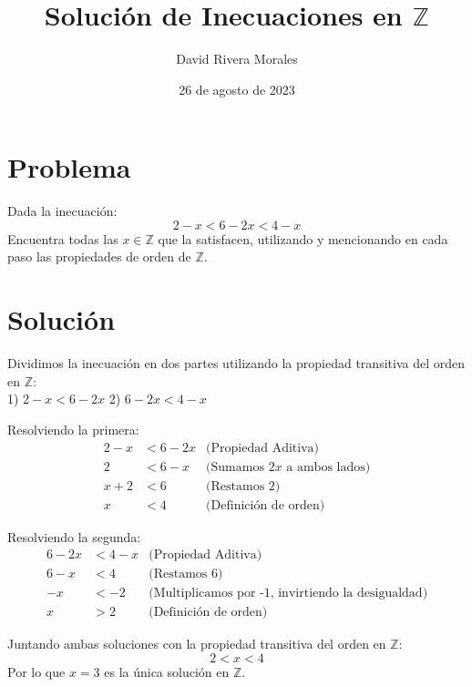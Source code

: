 \documentclass[12pt]{article}
\begin{document}
\title{Solución de Inecuaciones en \( \mathbb{Z} \)}
\author{David Rivera Morales}
\date{26 de agosto de 2023}

\maketitle

\section*{Problema}
Dada la inecuación:
\[
2 - x < 6 - 2x < 4 - x
\]
Encuentra todas las \( x \in \mathbb{Z} \) que la satisfacen, utilizando y mencionando en cada paso las propiedades de orden de \( \mathbb{Z} \).

\section*{Solución}
Dividimos la inecuación en dos partes utilizando la propiedad transitiva del orden en \( \mathbb{Z} \): \\
1) \(2 - x < 6 - 2x\)
2) \(6 - 2x < 4 - x\)

Resolviendo la primera:
\begin{align*}
2 - x &< 6 - 2x & \text{(Propiedad Aditiva)} \\
2 &< 6 - x & \text{(Sumamos } 2x \text{ a ambos lados)} \\
x + 2 &< 6 & \text{(Restamos 2)} \\
x &< 4 & \text{(Definición de orden)}
\end{align*}

Resolviendo la segunda:
\begin{align*}
6 - 2x &< 4 - x & \text{(Propiedad Aditiva)} \\
6 - x &< 4 & \text{(Restamos 6)} \\
-x &< -2 & \text{(Multiplicamos por -1, invirtiendo la desigualdad)} \\
x &> 2 & \text{(Definición de orden)}
\end{align*}

Juntando ambas soluciones con la propiedad transitiva del orden en \( \mathbb{Z} \):
\[
2 < x < 4
\]
Por lo que \(x = 3\) es la única solución en \(\mathbb{Z}\).
\end{document}
